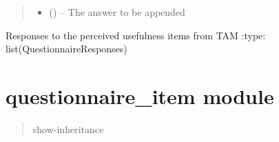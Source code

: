\documentclass[letterpaper,10pt,english]{sphinxmanual}
\begin{document}
\begin{fulllineitems}
\begin{fulllineitems}
\begin{quote}
\begin{description}
\begin{itemize}
\item {} 
 (\href{https://docs.python.org/2/library/string.html\#module-string}{}) -- The answer to be appended

\end{itemize}

\end{description}\end{quote}

\end{fulllineitems}


\begin{fulllineitems}
\label{\detokenize{questionnaire:questionnaire.Questionnaire.perceived_usefulness_items}}
Responses to the perceived usefulness items from TAM
:type: list(QuestionnaireResponses)

\end{fulllineitems}


\end{fulllineitems}



\chapter{questionnaire\_item module}
\label{\detokenize{questionnaire_item:questionnaire-item-module}}\label{\detokenize{questionnaire_item:module-questionnaire_item}}\label{\detokenize{questionnaire_item::doc}}\begin{quote}\begin{description}
\item[{show-inheritance}] \leavevmode
\end{description}\end{quote}
\end{document}
